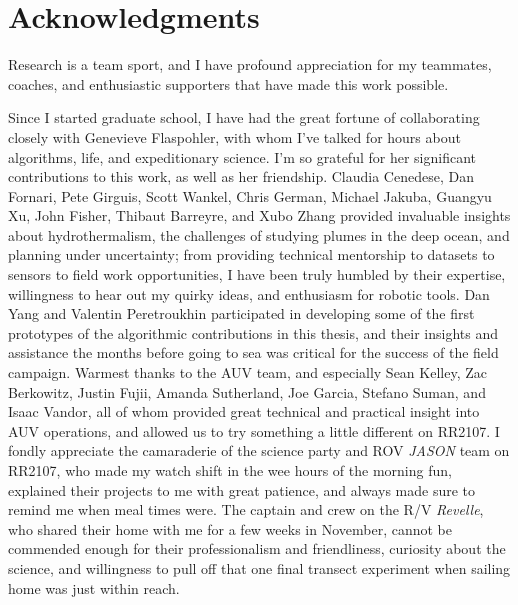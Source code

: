 \chapter*{Acknowledgments}

Research is a team sport, and I have profound appreciation for my teammates, coaches, and enthusiastic supporters that have made this work possible.

Since I started graduate school, I have had the great fortune of collaborating closely with Genevieve Flaspohler, with whom I've talked for hours about algorithms, life, and expeditionary science. I'm so grateful for her significant contributions to this work, as well as her friendship. Claudia Cenedese, Dan Fornari, Pete Girguis, Scott Wankel, Chris German, Michael Jakuba, Guangyu Xu, John Fisher, Thibaut Barreyre, and Xubo Zhang provided invaluable insights about hydrothermalism, the challenges of studying plumes in the deep ocean, and planning under uncertainty; from providing technical mentorship to datasets to sensors to field work opportunities, I have been truly humbled by their expertise, willingness to hear out my quirky ideas, and enthusiasm for robotic tools. Dan Yang and Valentin Peretroukhin participated in developing some of the first prototypes of the algorithmic contributions in this thesis, and their insights and assistance the months before going to sea was critical for the success of the field campaign. Warmest thanks to the AUV \Sentry team, and especially Sean Kelley, Zac Berkowitz, Justin Fujii, Amanda Sutherland, Joe Garcia, Stefano Suman, and Isaac Vandor, all of whom provided great technical and practical insight into AUV operations, and allowed us to try something a little different on RR2107. I fondly appreciate the camaraderie of the science party and ROV \emph{JASON} team on RR2107, who made my watch shift in the wee hours of the morning fun, explained their projects to me with great patience, and always made sure to remind me when meal times were. The captain and crew on the R/V \emph{Revelle}, who shared their home with me for a few weeks in November, cannot be commended enough for their professionalism and friendliness, curiosity about the science, and willingness to pull off that one final transect experiment when sailing home was just within reach.  


